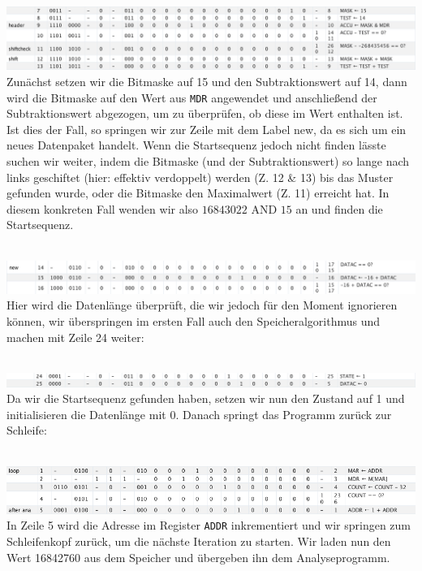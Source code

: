 \documentclass[12pt,titlepage]{article}
\begin{document}
\leavevmode \\
\includegraphics[width=16cm]{listing/row7-13.png}
\leavevmode \\
Zunächst setzen wir die Bitmaske auf 15 und den Subtraktionswert auf 14, dann
wird die Bitmaske auf den Wert aus \texttt{MDR} angewendet und anschließend der Subtraktionswert abgezogen, um
zu überprüfen, ob diese im Wert enthalten ist. Ist dies der Fall, so springen wir zur Zeile mit dem Label \dq new\dq, 
da es sich um ein neues Datenpaket handelt. Wenn die Startsequenz jedoch nicht finden lässte suchen wir weiter, indem die Bitmaske (und der Subtraktionswert)
so lange nach links geschiftet (hier: effektiv verdoppelt) werden (Z. 12 & 13) bis das Muster gefunden wurde, oder die Bitmaske den Maximalwert (Z. 11) erreicht hat.
In diesem konkreten Fall wenden wir also $16843022 \text{ AND } 15$ an und finden
die Startsequenz.

\leavevmode \\
\includegraphics[width=16cm]{listing/row14-16.png}
\leavevmode \\
Hier wird die Datenlänge überprüft, die wir jedoch für den Moment ignorieren können, wir überspringen im ersten Fall auch den Speicheralgorithmus und machen mit Zeile 24 weiter:

\leavevmode \\
\includegraphics[width=16cm]{listing/row24-25.png}
\leavevmode \\
Da wir die Startsequenz gefunden haben, setzen wir nun den Zustand auf 1 und initialisieren die Datenlänge mit 0. Danach springt
das Programm zurück zur Schleife:

\leavevmode \\
\includegraphics[width=16cm]{listing/row1-5.png}
\leavevmode \\
In Zeile 5 wird die Adresse im Register \texttt{ADDR} inkrementiert und wir springen zum Schleifenkopf zurück, um die nächste
Iteration zu starten. Wir laden nun den Wert 16842760 aus dem Speicher und übergeben ihn dem Analyseprogramm.
\end{document}
